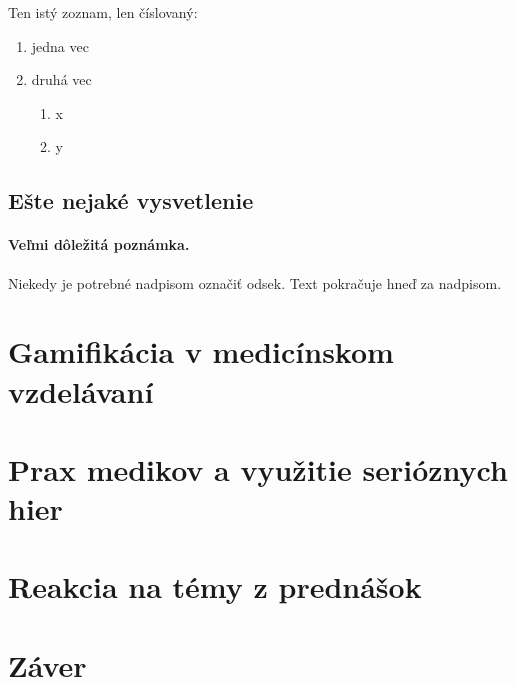 \documentclass[10pt,twoside,slovak,a4paper]{article}
\begin{document}
Ten istý zoznam, len číslovaný:

\begin{enumerate}
\item jedna vec
\item druhá vec
	\begin{enumerate}
	\item x
	\item y
	\end{enumerate}
\end{enumerate}


\subsection{Ešte nejaké vysvetlenie} \label{ina:este}

\paragraph{Veľmi dôležitá poznámka.}
Niekedy je potrebné nadpisom označiť odsek. Text pokračuje hneď za nadpisom.



\section{Gamifikácia v medicínskom vzdelávaní} \label{tretiacast}




\section{Prax medikov a využitie serióznych hier} \label{stvrtacast}

\section{Reakcia na témy z prednášok} \label{prednasky}


\section{Záver} \label{zaver} %






\end{document}
